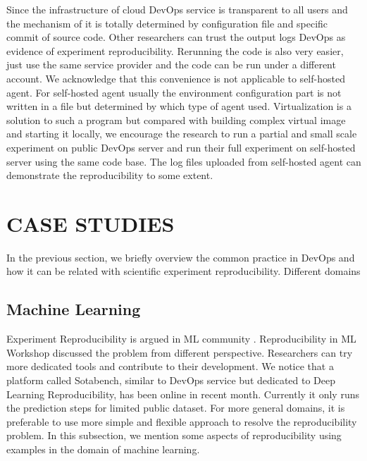 \documentclass{IEEEcsmag}
\begin{document}
Since the infrastructure of cloud DevOps service is transparent to all users and the mechanism of it is totally determined by configuration file and specific commit of source code. Other researchers can trust the output logs DevOps as evidence of experiment reproducibility. Rerunning the code is also very easier, just use the same service provider and the code can be run under a different account. We acknowledge that this convenience is not applicable to self-hosted agent. For self-hosted agent usually the environment configuration part is not written in a file but determined by which type of agent used. Virtualization is a solution to such a program but compared with building complex virtual image and starting it locally, we encourage the research to run a partial and small scale experiment on public DevOps server and run their full experiment on self-hosted server using the same code base. The log files uploaded from self-hosted agent can demonstrate the reproducibility to some extent.

\section{CASE STUDIES}
In the previous section, we briefly overview the common practice in DevOps and how it can be related with scientific experiment reproducibility. Different domains 

\subsection{Machine Learning}
Experiment Reproducibility is argued in ML community \cite{kegl2018ramp}. Reproducibility in ML Workshop discussed the problem from different perspective. Researchers can try more dedicated tools and contribute to their development. We notice that a platform called \textsf{Sotabench}, similar to DevOps service but dedicated to Deep Learning Reproducibility, has been online in recent month. Currently it only runs the prediction steps for limited public dataset. For more general domains, it is preferable to use more simple and flexible approach to resolve the reproducibility problem. In this subsection, we mention some aspects of reproducibility using examples in the domain of machine learning. 
\end{document}
